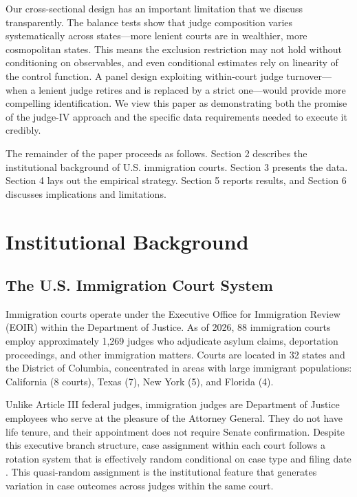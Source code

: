 \documentclass[12pt]{article}
\begin{document}
Our cross-sectional design has an important limitation that we discuss transparently. The balance tests show that judge composition varies systematically across states---more lenient courts are in wealthier, more cosmopolitan states. This means the exclusion restriction may not hold without conditioning on observables, and even conditional estimates rely on linearity of the control function. A panel design exploiting within-court judge turnover---when a lenient judge retires and is replaced by a strict one---would provide more compelling identification. We view this paper as demonstrating both the promise of the judge-IV approach and the specific data requirements needed to execute it credibly.

The remainder of the paper proceeds as follows. Section 2 describes the institutional background of U.S. immigration courts. Section 3 presents the data. Section 4 lays out the empirical strategy. Section 5 reports results, and Section 6 discusses implications and limitations.


\section{Institutional Background}

\subsection{The U.S. Immigration Court System}

Immigration courts operate under the Executive Office for Immigration Review (EOIR) within the Department of Justice. As of 2026, 88 immigration courts employ approximately 1,269 judges who adjudicate asylum claims, deportation proceedings, and other immigration matters. Courts are located in 32 states and the District of Columbia, concentrated in areas with large immigrant populations: California (8 courts), Texas (7), New York (5), and Florida (4).

Unlike Article III federal judges, immigration judges are Department of Justice employees who serve at the pleasure of the Attorney General. They do not have life tenure, and their appointment does not require Senate confirmation. Despite this executive branch structure, case assignment within each court follows a rotation system that is effectively random conditional on case type and filing date \citep{ramji2021, chen2016}. This quasi-random assignment is the institutional feature that generates variation in case outcomes across judges within the same court.
\end{document}
